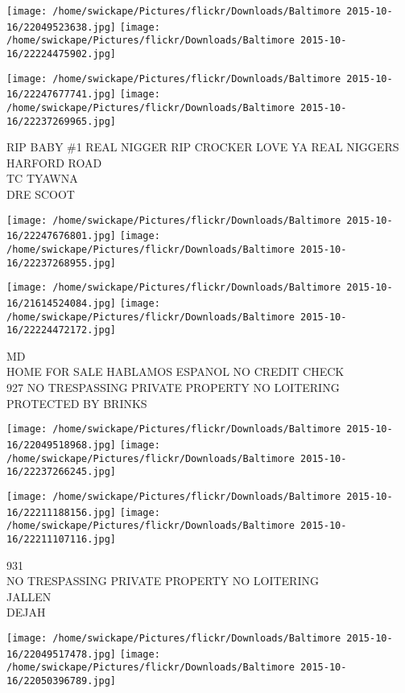 \documentclass[10pt,letterpaper]{article}
\begin{document}
\texttt{[image: /home/swickape/Pictures/flickr/Downloads/Baltimore 2015-10-16/22049523638.jpg]}
\texttt{[image: /home/swickape/Pictures/flickr/Downloads/Baltimore 2015-10-16/22224475902.jpg]}

\texttt{[image: /home/swickape/Pictures/flickr/Downloads/Baltimore 2015-10-16/22247677741.jpg]}
\texttt{[image: /home/swickape/Pictures/flickr/Downloads/Baltimore 2015-10-16/22237269965.jpg]}

RIP BABY \#1  REAL NIGGER RIP CROCKER LOVE YA REAL NIGGERS\\
HARFORD ROAD\\
TC TYAWNA\\
DRE SCOOT\\
\pagebreak

\texttt{[image: /home/swickape/Pictures/flickr/Downloads/Baltimore 2015-10-16/22247676801.jpg]}
\texttt{[image: /home/swickape/Pictures/flickr/Downloads/Baltimore 2015-10-16/22237268955.jpg]}

\texttt{[image: /home/swickape/Pictures/flickr/Downloads/Baltimore 2015-10-16/21614524084.jpg]}
\texttt{[image: /home/swickape/Pictures/flickr/Downloads/Baltimore 2015-10-16/22224472172.jpg]}

MD\\
HOME FOR SALE HABLAMOS ESPANOL NO CREDIT CHECK\\
927 NO TRESPASSING PRIVATE PROPERTY NO LOITERING\\
PROTECTED BY BRINKS\\
\pagebreak

\texttt{[image: /home/swickape/Pictures/flickr/Downloads/Baltimore 2015-10-16/22049518968.jpg]}
\texttt{[image: /home/swickape/Pictures/flickr/Downloads/Baltimore 2015-10-16/22237266245.jpg]}

\texttt{[image: /home/swickape/Pictures/flickr/Downloads/Baltimore 2015-10-16/22211188156.jpg]}
\texttt{[image: /home/swickape/Pictures/flickr/Downloads/Baltimore 2015-10-16/22211107116.jpg]}

931\\
NO TRESPASSING PRIVATE PROPERTY NO LOITERING\\
JALLEN\\
DEJAH\\
\pagebreak

\texttt{[image: /home/swickape/Pictures/flickr/Downloads/Baltimore 2015-10-16/22049517478.jpg]}
\texttt{[image: /home/swickape/Pictures/flickr/Downloads/Baltimore 2015-10-16/22050396789.jpg]}
\end{document}
